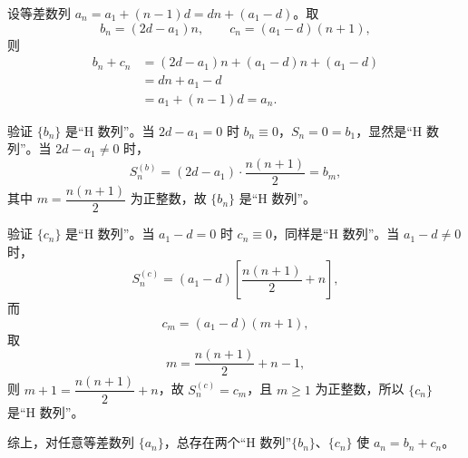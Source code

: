 \begin{answer}

设等差数列 $a_n=a_1+(n-1)d=dn+(a_1-d)$。取
\nopagebreak[4]
\[b_n=(2d-a_1)n,\qquad c_n=(a_1-d)(n+1),\]
则
\nopagebreak[4]
\[\begin{aligned}
b_n+c_n&=(2d-a_1)n+(a_1-d)n+(a_1-d)\\
&=dn+a_1-d\\
&=a_1+(n-1)d=a_n.
\end{aligned}\]

验证 $\{b_n\}$ 是“H 数列”。当 $2d-a_1=0$ 时 $b_n\equiv0$，$S_n=0=b_1$，显然是“H 数列”。当 $2d-a_1\neq0$ 时，
\nopagebreak[4]
\[S_n^{(b)}=(2d-a_1)\cdot\frac{n(n+1)}2=b_m,\]
其中 $m=\dfrac{n(n+1)}2$ 为正整数，故 $\{b_n\}$ 是“H 数列”。

验证 $\{c_n\}$ 是“H 数列”。当 $a_1-d=0$ 时 $c_n\equiv0$，同样是“H 数列”。当 $a_1-d\neq0$ 时，
\nopagebreak[4]
\[S_n^{(c)}=(a_1-d)\left[\frac{n(n+1)}2+n\right],\]
而
\nopagebreak[4]
\[c_m=(a_1-d)(m+1),\]
取
\nopagebreak[4]
\[m=\frac{n(n+1)}2+n-1,\]
则 $m+1=\dfrac{n(n+1)}2+n$，故 $S_n^{(c)}=c_m$，且 $m\geqslant1$ 为正整数，所以 $\{c_n\}$ 是“H 数列”。

综上，对任意等差数列 $\{a_n\}$，总存在两个“H 数列”$\{b_n\}$、$\{c_n\}$ 使 $a_n=b_n+c_n$。




\end{answer}
